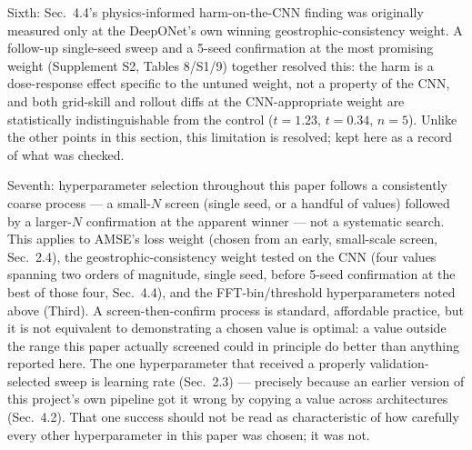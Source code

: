 \documentclass[11pt]{article}
\begin{document}
Sixth: Sec.~4.4's physics-informed harm-on-the-CNN finding was originally measured only at the DeepONet's own winning geostrophic-consistency weight. A follow-up single-seed sweep and a 5-seed confirmation at the most promising weight (Supplement S2, Tables 8/S1/9) together resolved this: the harm is a dose-response effect specific to the untuned weight, not a property of the CNN, and both grid-skill and rollout diffs at the CNN-appropriate weight are statistically indistinguishable from the control ($t=1.23$, $t=0.34$, $n=5$). Unlike the other points in this section, this limitation is resolved; kept here as a record of what was checked.

Seventh: hyperparameter selection throughout this paper follows a consistently coarse process --- a small-$N$ screen (single seed, or a handful of values) followed by a larger-$N$ confirmation at the apparent winner --- not a systematic search. This applies to AMSE's loss weight (chosen from an early, small-scale screen, Sec.~2.4), the geostrophic-consistency weight tested on the CNN (four values spanning two orders of magnitude, single seed, before 5-seed confirmation at the best of those four, Sec.~4.4), and the FFT-bin/threshold hyperparameters noted above (Third). A screen-then-confirm process is standard, affordable practice, but it is not equivalent to demonstrating a chosen value is optimal: a value outside the range this paper actually screened could in principle do better than anything reported here. The one hyperparameter that received a properly validation-selected sweep is learning rate (Sec.~2.3) --- precisely because an earlier version of this project's own pipeline got it wrong by copying a value across architectures (Sec.~4.2). That one success should not be read as characteristic of how carefully every other hyperparameter in this paper was chosen; it was not.
\end{document}
